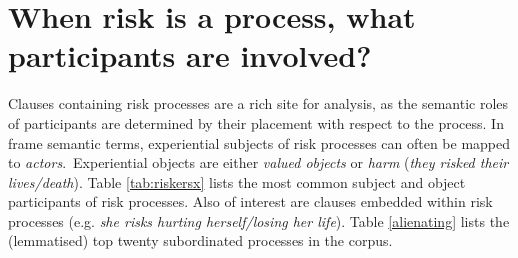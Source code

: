 \section{When risk is a process, what participants are involved?} \FloatBarrier

Clauses containing risk processes are a rich site for analysis, as the semantic roles of participants are determined by their placement with respect to the process. In frame semantic terms, experiential subjects of risk processes can often be mapped to \emph{actors}.~Experiential objects are either \emph{valued objects} or \emph{harm} (\emph{they risked their lives/death}). Table \ref{tab:riskersx} lists the most common subject and object participants of risk processes. Also of interest are clauses embedded within risk processes (e.g. \emph{she risks hurting herself\slash losing her life}). Table \ref{alienating} lists the (lemmatised) top twenty subordinated processes in the corpus.

